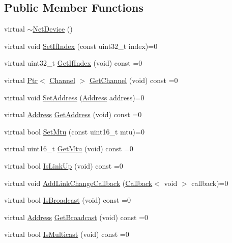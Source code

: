 \subsection*{Public Member Functions}
\begin{DoxyCompactItemize}
\item 
virtual \hyperlink{classns3_1_1NetDevice_a6627d27e473affd44db5209f0d3a8e66}{$\sim$\+Net\+Device} ()
\item 
virtual void \hyperlink{classns3_1_1NetDevice_a2e1ac6c1189cd565420305d85a193fb8}{Set\+If\+Index} (const uint32\+\_\+t index)=0
\item 
virtual uint32\+\_\+t \hyperlink{classns3_1_1NetDevice_a8c1ae2ec8eadc4524dfc1e425bfa0850}{Get\+If\+Index} (void) const =0
\item 
virtual \hyperlink{classns3_1_1Ptr}{Ptr}$<$ \hyperlink{classns3_1_1Channel}{Channel} $>$ \hyperlink{classns3_1_1NetDevice_a3d810bd2738634e2e851661271828565}{Get\+Channel} (void) const =0
\item 
virtual void \hyperlink{classns3_1_1NetDevice_ab56dc36bc0547471ab3210eda60ee76c}{Set\+Address} (\hyperlink{classns3_1_1Address}{Address} address)=0
\item 
virtual \hyperlink{classns3_1_1Address}{Address} \hyperlink{classns3_1_1NetDevice_a671f99de496d6f09ae343bb715301fb2}{Get\+Address} (void) const =0
\item 
virtual bool \hyperlink{classns3_1_1NetDevice_a2ba4956d45cde68eab3cbdd6ede06df0}{Set\+Mtu} (const uint16\+\_\+t mtu)=0
\item 
virtual uint16\+\_\+t \hyperlink{classns3_1_1NetDevice_a91f4f5d01bc2d567c1e0a69b63a4cf14}{Get\+Mtu} (void) const =0
\item 
virtual bool \hyperlink{classns3_1_1NetDevice_afe1822b79e19a05ab95f693c8fb64fc7}{Is\+Link\+Up} (void) const =0
\item 
virtual void \hyperlink{classns3_1_1NetDevice_aafb1bf869d38ef7a7112d11fab0163a3}{Add\+Link\+Change\+Callback} (\hyperlink{classns3_1_1Callback}{Callback}$<$ void $>$ callback)=0
\item 
virtual bool \hyperlink{classns3_1_1NetDevice_a67f992b20858cd7b397d8fba2feff141}{Is\+Broadcast} (void) const =0
\item 
virtual \hyperlink{classns3_1_1Address}{Address} \hyperlink{classns3_1_1NetDevice_a4724e03bc548dd8e967cc4a7356197bd}{Get\+Broadcast} (void) const =0
\item 
virtual bool \hyperlink{classns3_1_1NetDevice_a1afb4848a9226540f1ff51f9b31ae95e}{Is\+Multicast} (void) const =0

\end{DoxyCompactItemize}
